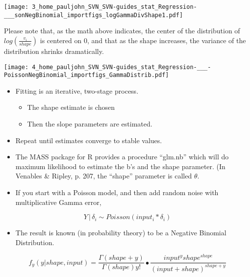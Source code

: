 \documentclass[10pt,english]{beamer}
\def\lyxframeend{} %
\begin{document}
\lyxframeend{}

\begin{center}
\texttt{[image: 3\_home\_pauljohn\_SVN\_SVN-guides\_stat\_Regression-\_\_\_sonNegBinomial\_importfigs\_logGammaDivShape1.pdf]}
\par\end{center}

Please note that, as the math above indicates, the center of the distribution
of $log(\frac{v_{i}}{shape})$ is centered on 0, and that as the shape
increases, the variance of the distribution shrinks dramatically.


\lyxframeend{}

\begin{center}
\texttt{[image: 4\_home\_pauljohn\_SVN\_SVN-guides\_stat\_Regression-\_\_\_-PoissonNegBinomial\_importfigs\_GammaDistrib.pdf]}
\par\end{center}


\lyxframeend{}
\begin{itemize}
\item Fitting is an iterative, two-stage process. 

\begin{itemize}
\item The shape estimate is chosen
\item Then the slope parameters are estimated. 
\end{itemize}
\item Repeat until estimates converge to stable values.
\item The MASS package for R provides a procedure ``glm.nb'' which will
do maximum likelihood to estimate the b's and the shape parameter.
(In Venables \& Ripley, p. 207, the ``shape'' parameter is called
$\theta$. 
\end{itemize}

\lyxframeend{}
\begin{itemize}
\item If you start with a Poisson model, and then add random noise with
multiplicative Gamma error, 
\end{itemize}
\[
Y\,|\,\delta_{i}\sim Poisson(input_{i}*\delta_{i})
\]

\begin{itemize}
\item The result is known (in probability theory) to be a Negative Binomial
Distribution. 
\end{itemize}
\[
f_{y}(y|shape,input)=\frac{\Gamma(shape+y)}{\Gamma(shape)y!}\bullet\frac{input^{y}shape^{shape}}{(input+shape)^{shape+y}}
\]
\end{document}
